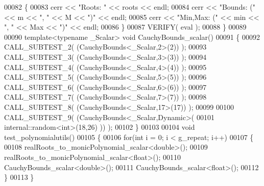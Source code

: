 \begin{DoxyCode}
00082   \{
00083     cerr << \textcolor{stringliteral}{"Roots: "} << roots << endl;
00084     cerr << \textcolor{stringliteral}{"Bounds: ("} << m << \textcolor{stringliteral}{", "} << M << \textcolor{stringliteral}{")"} << endl;
00085     cerr << \textcolor{stringliteral}{"Min,Max: ("} << min << \textcolor{stringliteral}{", "} << Max << \textcolor{stringliteral}{")"} << endl;
00086   \}
00087   VERIFY( eval );
00088 \}
00089 
00090 \textcolor{keyword}{template}<\textcolor{keyword}{typename} \_Scalar> \textcolor{keywordtype}{void} CauchyBounds\_scalar()
00091 \{
00092   CALL\_SUBTEST\_2( (CauchyBounds<\_Scalar,2>(2)) );
00093   CALL\_SUBTEST\_3( (CauchyBounds<\_Scalar,3>(3)) );
00094   CALL\_SUBTEST\_4( (CauchyBounds<\_Scalar,4>(4)) );
00095   CALL\_SUBTEST\_5( (CauchyBounds<\_Scalar,5>(5)) );
00096   CALL\_SUBTEST\_6( (CauchyBounds<\_Scalar,6>(6)) );
00097   CALL\_SUBTEST\_7( (CauchyBounds<\_Scalar,7>(7)) );
00098   CALL\_SUBTEST\_8( (CauchyBounds<\_Scalar,17>(17)) );
00099 
00100   CALL\_SUBTEST\_9( (CauchyBounds<\_Scalar,Dynamic>(
00101           internal::random<int>(18,26) )) );
00102 \}
00103 
00104 \textcolor{keywordtype}{void} test\_polynomialutils()
00105 \{
00106   \textcolor{keywordflow}{for}(\textcolor{keywordtype}{int} i = 0; i < g\_repeat; i++)
00107   \{
00108     realRoots\_to\_monicPolynomial\_scalar<double>();
00109     realRoots\_to\_monicPolynomial\_scalar<float>();
00110     CauchyBounds\_scalar<double>();
00111     CauchyBounds\_scalar<float>();
00112   \}
00113 \}
\end{DoxyCode}
